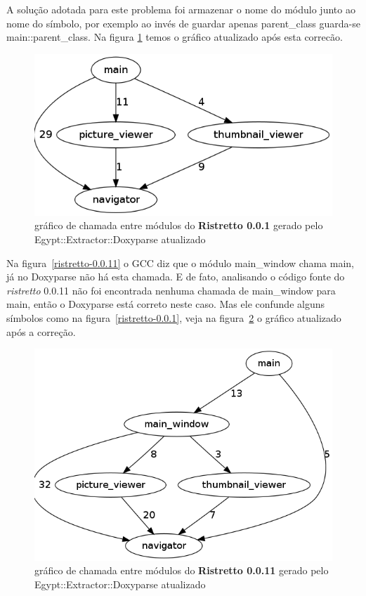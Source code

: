 A solução adotada para este problema foi armazenar o nome do módulo junto ao
nome do símbolo, por exemplo ao invés de guardar apenas parent\_class guarda-se
main::parent\_class. Na figura \ref{ristretto-0.0.1-doxyparse-2} temos o
gráfico atualizado após esta correcão.

\begin{figure}[h]
\center
\includegraphics[scale=0.3]{imagens/ristretto-0_0_1-doxyparse-2}
\caption{gráfico de chamada entre módulos do {\bf Ristretto 0.0.1} gerado pelo Egypt::Extractor::Doxyparse atualizado}
\label{ristretto-0.0.1-doxyparse-2}
\end{figure}

Na figura~\ref{ristretto-0.0.11} o GCC diz que o módulo main\_window chama
main, já no Doxyparse não há esta chamada. E de fato, analisando o código fonte
do {\it ristretto} 0.0.11 não foi encontrada nenhuma chamada de main\_window para
main, então o Doxyparse está correto neste caso. Mas ele confunde alguns
símbolos como na figura~\ref{ristretto-0.0.1}, veja na
figura~\ref{ristretto-0.0.11-doxyparse-2} o gráfico atualizado após a correção.

\begin{figure}
\center
\includegraphics[scale=0.3]{imagens/ristretto-0_0_11-doxyparse-2}
\caption{gráfico de chamada entre módulos do {\bf Ristretto 0.0.11} gerado pelo Egypt::Extractor::Doxyparse atualizado}
\label{ristretto-0.0.11-doxyparse-2}
\end{figure}


